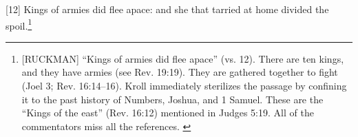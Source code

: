 [12] \textcolor[rgb]{0.00,0.00,1.00}{Kings of armies did flee apace: and she that tarried at home divided the spoil.}\footnote{[RUCKMAN] “Kings of armies did flee apace” (vs. 12). There are ten kings, and they have armies (see Rev. 19:19). They are gathered together to fight (Joel 3; Rev. 16:14–16). Kroll immediately sterilizes the passage by confining it to the past history of Numbers, Joshua, and 1 Samuel. These are the “Kings of the east” (Rev. 16:12) mentioned in Judges 5:19. All of the commentators miss all the references.  \cite{Ruckman1992Psalms}  }
